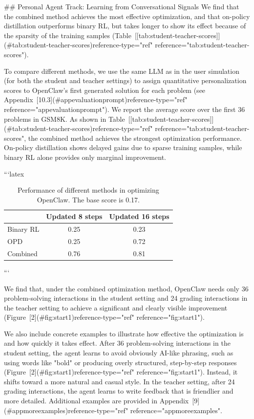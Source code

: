 ## Personal Agent Track: Learning from Conversational Signals
We find that the combined method achieves the most effective optimization, and that on-policy distillation outperforms binary RL, but takes longer to show its effect because of the sparsity of the training samples (Table [[tab:student-teacher-scores]](#tab:student-teacher-scores)reference-type="ref" reference="tab:student-teacher-scores").

To compare different methods, we use the same LLM as in the user simulation (for both the student and teacher settings) to assign quantitative personalization scores to OpenClaw's first generated solution for each problem (see Appendix [10.3](#appevaluationprompt)reference-type="ref" reference="appevaluationprompt"). We report the average score over the first 36 problems in GSM8K. As shown in Table [[tab:student-teacher-scores]](#tab:student-teacher-scores)reference-type="ref" reference="tab:student-teacher-scores", the combined method achieves the strongest optimization performance. On-policy distillation shows delayed gains due to sparse training samples, while binary RL alone provides only marginal improvement.


```latex
\begin{table}[h]
\centering
\caption{Performance of different methods in optimizing OpenClaw. The base score is 0.17.}
\label{tab:student-teacher-scores}
\renewcommand{\arraystretch}{1.15}
\begin{tabular}{lcc}
\toprule
 & Updated 8 steps & Updated 16 steps \\
\midrule
Binary RL & 0.25 & 0.23 \\
OPD & 0.25 & 0.72 \\
Combined & 0.76 & 0.81 \\
\bottomrule
\end{tabular}
\end{table}
```


We find that, under the combined optimization method, OpenClaw needs only 36 problem-solving interactions in the student setting and 24 grading interactions in the teacher setting to achieve a significant and clearly visible improvement (Figure [2](#fig:start1)reference-type="ref" reference="fig:start1").

We also include concrete examples to illustrate how effective the optimization is and how quickly it takes effect. After 36 problem-solving interactions in the student setting, the agent learns to avoid obviously AI-like phrasing, such as using words like "bold" or producing overly structured, step-by-step responses (Figure [2](#fig:start1)reference-type="ref" reference="fig:start1"). Instead, it shifts toward a more natural and casual style. In the teacher setting, after 24 grading interactions, the agent learns to write feedback that is friendlier and more detailed. Additional examples are provided in Appendix [9](#appmoreexamples)reference-type="ref" reference="appmoreexamples".

